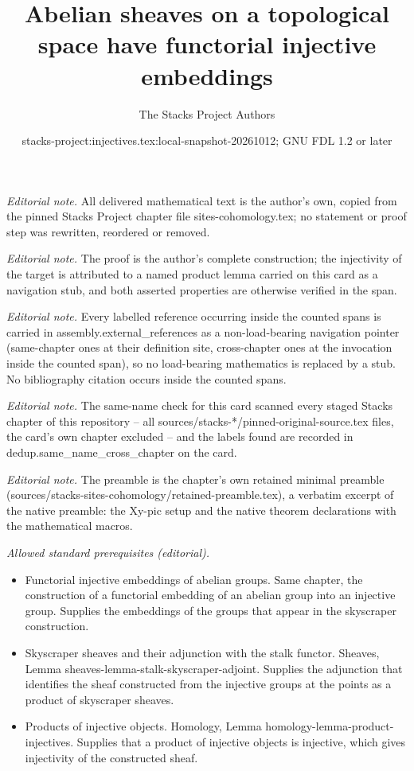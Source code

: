 \documentclass[10pt,a4paper]{amsart}
\title{Abelian sheaves on a topological space have functorial injective embeddings}
\author{The Stacks Project Authors}
\date{stacks-project:injectives.tex:local-snapshot-20261012; GNU FDL 1.2 or later}
\theoremstyle{plain}
\theoremstyle{definition}
\theoremstyle{remark}
\numberwithin{equation}{subsection}
\begin{document}
\maketitle
\noindent\textit{Editorial note.} All delivered mathematical text is the author's own, copied from the pinned Stacks Project chapter file sites-cohomology.tex; no statement or proof step was rewritten, reordered or removed.\par\medskip
\noindent\textit{Editorial note.} The proof is the author's complete construction; the injectivity of the target is attributed to a named product lemma carried on this card as a navigation stub, and both asserted properties are otherwise verified in the span.\par\medskip
\noindent\textit{Editorial note.} Every labelled reference occurring inside the counted spans is carried in assembly.external\_references as a non-load-bearing navigation pointer (same-chapter ones at their definition site, cross-chapter ones at the invocation inside the counted span), so no load-bearing mathematics is replaced by a stub. No bibliography citation occurs inside the counted spans.\par\medskip
\noindent\textit{Editorial note.} The same-name check for this card scanned every staged Stacks chapter of this repository -- all sources/stacks-*/pinned-original-source.tex files, the card's own chapter excluded -- and the labels found are recorded in dedup.same\_name\_cross\_chapter on the card.\par\medskip
\noindent\textit{Editorial note.} The preamble is the chapter's own retained minimal preamble (sources/stacks-sites-cohomology/retained-preamble.tex), a verbatim excerpt of the native preamble: the Xy-pic setup and the native theorem declarations with the mathematical macros.\par\medskip
\noindent\textit{Allowed standard prerequisites (editorial).}\begin{itemize}
\item Functorial injective embeddings of abelian groups. Same chapter, the construction of a functorial embedding of an abelian group into an injective group. Supplies the embeddings of the groups that appear in the skyscraper construction.
\item Skyscraper sheaves and their adjunction with the stalk functor. Sheaves, Lemma sheaves-lemma-stalk-skyscraper-adjoint. Supplies the adjunction that identifies the sheaf constructed from the injective groups at the points as a product of skyscraper sheaves.
\item Products of injective objects. Homology, Lemma homology-lemma-product-injectives. Supplies that a product of injective objects is injective, which gives injectivity of the constructed sheaf.
\end{itemize}\medskip
\end{document}
